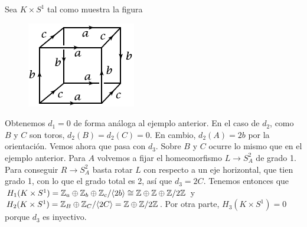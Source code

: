 \documentclass[TA.tex]{subfiles}
\begin{document}
\begin{ej}
Sea $K\times S^1$ tal como muestra la figura 

\begin{figure}[h!]
\includegraphics[scale=0.7]{derecha}
\end{figure}


Obtenemos $d_1=0$ de forma análoga al ejemplo anterior. En el caso de $d_2$, como $B$ y $C$ son toros, $d_2(B)=d_2(C)=0$. En cambio, $d_2(A)=2b$ por la orientación. Vemos ahora que pasa con $d_3$. Sobre $B$ y $C$ ocurre lo mismo que en el ejemplo anterior. Para $A$ volvemos a fijar el homeomorfismo $L\to S^2_A$ de grado 1. Para conseguir $R\to S^2_A$ basta rotar $L$ con respecto a un eje horizontal, que tien grado 1, con lo que el grado total es 2, así que $d_3=2C$. Tenemos entonces que $H_1(K\times S^1)=\mathbb{Z}_a\oplus \mathbb{Z}_b\oplus \mathbb{Z}_c/\langle{2b}\rangle\cong\mathbb{Z}\oplus\mathbb{Z}\oplus\mathbb{Z}/2\mathbb{Z}$ y $H_2(K\times S^1)=\mathbb{Z}_B\oplus\mathbb{Z}_C/\langle{2C}\rangle=\mathbb{Z}\oplus\mathbb{Z}/2\mathbb{Z}$. Por otra parte, $H_3(K\times S^1)=0$ porque $d_3$ es inyectivo.  
\end{ej}
\end{document}
